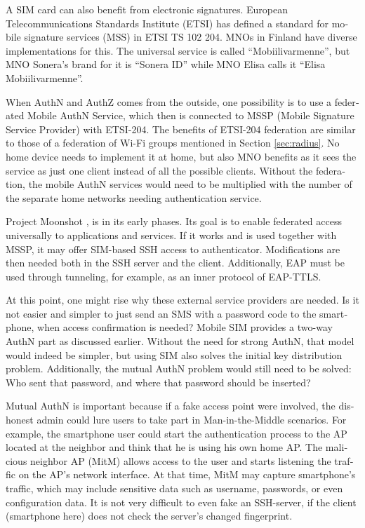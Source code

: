 \documentclass[12pt,a4paper,english]{tutthesis}
\begin{document}
\begin{otherlanguage}{english}
A SIM card can also benefit from electronic signatures.
European Telecommunications Standards Institute (ETSI) has defined a
standard for mobile signature services (MSS) in ETSI TS 102 204.
MNOs in Finland have diverse implementations for this. The universal 
service is called ``Mobiilivarmenne'', but MNO Sonera's brand for it
is ``Sonera ID'' while MNO Elisa calls it ``Elisa Mobiilivarmenne''.

When AuthN and AuthZ comes from the outside, one possibility is to use a
federated Mobile AuthN Service, which then is connected to  MSSP (Mobile
Signature Service Provider) with ETSI-204. The benefits of ETSI-204
federation are similar to those of a federation of Wi-Fi groups
mentioned in Section \ref{sec:radius}. No home device needs to implement it
at home, but also MNO benefits as it sees the service as just one
client instead of all the possible clients.  Without the federation, the mobile AuthN services would need to be
multiplied with the number of the separate home networks needing authentication service.



Project Moonshot \cite{moonshot}, is in its early phases. Its goal is
to enable federated access universally to applications and
services. If it works and is used together with MSSP, it may offer
SIM-based SSH access to authenticator. Modifications are then needed 
both in the SSH server and the client. Additionally, EAP must be used through
tunneling, for example, as an inner protocol of EAP-TTLS.

At this point, one might rise why these external service
providers are needed. Is it not easier and simpler to just send 
an SMS with a password code to the smartphone, when access confirmation is needed?
Mobile SIM provides a two-way AuthN part as discussed earlier.
Without the need for strong AuthN, that model would indeed be 
simpler, but using SIM also solves the initial key distribution problem.
Additionally, the mutual AuthN problem would still need to be solved:
Who sent that password, and where that password should be inserted?

Mutual AuthN is important because if a fake access point were involved, the 
dishonest admin could lure users to take part in Man-in-the-Middle scenarios.
For example, the smartphone user could start the authentication process
to the AP located at the neighbor and think that he is using
his own home AP. 
The malicious neighbor AP (MitM) allows access to the user and starts 
listening the traffic on the AP's network interface. At that time, 
MitM may capture smartphone's  traffic, which may  include
sensitive  data such as username, passwords, or even configuration data.
It is not very difficult to even fake an SSH-server, if the 
client (smartphone here) does not check the server's changed
fingerprint.





\end{otherlanguage}
\end{document}
